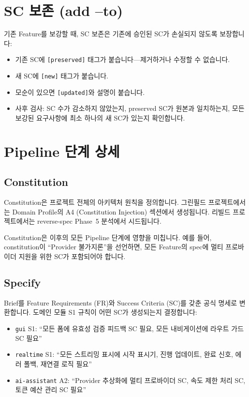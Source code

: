 \documentclass[11pt,a4paper,openright,twoside]{report}
\begin{document}
\section{SC 보존 (add --to)}

기존 Feature를 보강할 때, SC 보존은 기존에 승인된 SC가 손실되지 않도록 보장합니다:

\begin{itemize}
  \item 기존 SC에 \texttt{[preserved]} 태그가 붙습니다---제거하거나 수정할 수 없습니다.
  \item 새 SC에 \texttt{[new]} 태그가 붙습니다.
  \item 모순이 있으면 \texttt{[updated]}와 설명이 붙습니다.
  \item 사후 검사: SC 수가 감소하지 않았는지, preserved SC가 원본과 일치하는지, 모든 보강된 요구사항에 최소 하나의 새 SC가 있는지 확인합니다.
\end{itemize}

\section{Pipeline 단계 상세}

\subsection{Constitution}

Constitution은 프로젝트 전체의 아키텍처 원칙을 정의합니다. 그린필드 프로젝트에서는 Domain Profile의 A4 (Constitution Injection) 섹션에서 생성됩니다. 리빌드 프로젝트에서는 reverse-spec Phase~5 분석에서 시드됩니다.

Constitution은 이후의 모든 Pipeline 단계에 영향을 미칩니다. 예를 들어, constitution이 ``Provider 불가지론''을 선언하면, 모든 Feature의 spec에 멀티 프로바이더 지원을 위한 SC가 포함되어야 합니다.

\subsection{Specify}

Brief를 Feature Requirements (FR)와 Success Criteria (SC)를 갖춘 공식 명세로 변환합니다. 도메인 모듈 S1 규칙이 어떤 SC가 생성되는지 결정합니다:

\begin{itemize}
  \item \texttt{gui} S1: ``모든 폼에 유효성 검증 피드백 SC 필요, 모든 내비게이션에 라우트 가드 SC 필요''
  \item \texttt{realtime} S1: ``모든 스트리밍 표시에 시작 표시기, 진행 업데이트, 완료 신호, 에러 폴백, 재연결 로직 필요''
  \item \texttt{ai-assistant} A2: ``Provider 추상화에 멀티 프로바이더 SC, 속도 제한 처리 SC, 토큰 예산 관리 SC 필요''
\end{itemize}
\end{document}
